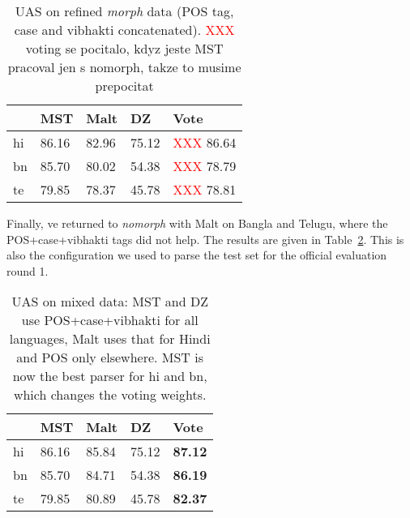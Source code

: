 \documentclass[11pt]{article}
\def\Tref#1{Table~\ref{#1}}
\newcommand{\XXX}{\textcolor{red}{XXX }} %
\begin{document}
\begin{table}[ht]
\begin{centering}
\begin{tabular}{l|l|l|l|l}
& \textbf{MST} & \textbf{Malt} & \textbf{DZ} & \textbf{Vote}\\
\hline
hi & 86.16 & 82.96 & 75.12 & \XXX 86.64\\
bn & 85.70 & 80.02 & 54.38 & \XXX 78.79\\
te & 79.85 & 78.37 & 45.78 & \XXX 78.81\\
\end{tabular}
\caption{UAS on refined \textit{morph} data (POS tag, case and vibhakti concatenated). \XXX voting se pocitalo, kdyz jeste MST pracoval jen s nomorph, takze to musime prepocitat}
\label{tab:poscasevib}
\end{centering}
\end{table}

Finally, ve returned to \textit{nomorph} with Malt on Bangla and Telugu, where the POS+case+vibhakti tags did not help. The results are given in \Tref{tab:posmix2}. This is also the configuration we used to parse the test set for the official evaluation round 1.

\begin{table}[ht]
\begin{centering}
\begin{tabular}{l|l|l|l|l}
& \textbf{MST} & \textbf{Malt} & \textbf{DZ} & \textbf{Vote}\\
\hline
hi & 86.16 & 85.84 & 75.12 & \textbf{87.12}\\
bn & 85.70 & 84.71 & 54.38 & \textbf{86.19}\\
te & 79.85 & 80.89 & 45.78 & \textbf{82.37}\\
\end{tabular}
\caption{UAS on mixed data: MST and DZ use POS+case+vibhakti for all languages, Malt uses that for Hindi and POS only elsewhere. MST is now the best parser for hi and bn, which changes the voting weights.}
\label{tab:posmix2}
\end{centering}
\end{table}
\end{document}
